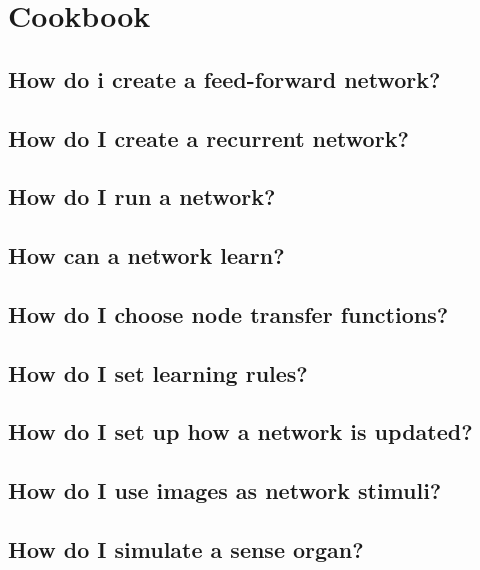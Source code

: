 \documentclass[12pt,letterpaper]{memoir}
\begin{document}
\chapter{Cookbook}
\label{chap:cookbook}

\section{How do i create a feed-forward network?}
\label{sec:feed-forward}

\section{How do I create a recurrent network?}
\label{sec:recurrent}

\section{How do I run a network?}
\label{sec:running-network}

\section{How can a network learn?}
\label{sec:learning}

\section{How do I choose node transfer functions?}
\label{sec:transfer-functions}

\section{How do I set learning rules?}
\label{sec:learning-rules}

\section{How do I set up how a network is updated?}
\label{sec:spreading}

\section{How do I use images as network stimuli?}
\label{sec:images}

\section{How do I simulate a sense organ?}
\label{sec:sense-organ}
\end{document}
